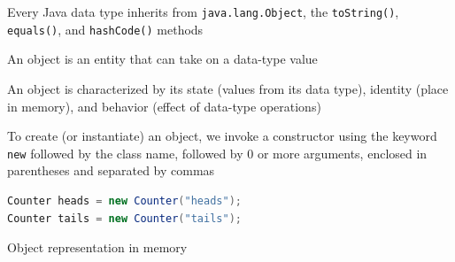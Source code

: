 \documentclass[8pt,a4paper,compress]{beamer}
\begin{document}
\begin{frame}[fragile]
\pause

Every Java data type inherits from \lstinline{java.lang.Object}, the \lstinline{toString()}, \lstinline{equals()}, and \lstinline{hashCode()} methods

\pause
\bigskip

An object is an entity that can take on a data-type value

\pause
\bigskip

An object is characterized by its state (values from its data type), identity (place in memory), and behavior (effect of data-type operations)

\pause
\bigskip

To create (or instantiate) an object, we invoke a constructor using the keyword \lstinline{new} followed by the class name, followed by 0 or more arguments, enclosed in parentheses and separated by commas

\begin{lstlisting}[language=Java]
Counter heads = new Counter("heads");
Counter tails = new Counter("tails");
\end{lstlisting}

\pause
\bigskip

Object representation in memory
\begin{center}
\end{center}
\end{frame}
\end{document}
